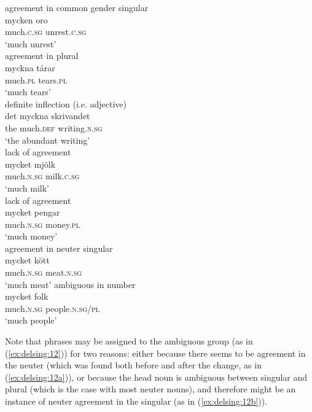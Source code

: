 \documentclass[output=paper]{langscibook}
\begin{document}
\ea\label{ex:delsing:10}
\ea\label{ex:delsing:10a}agreement in common gender singular\\
\gll mycken        oro\\
    much.\textsc{c.sg}      unrest.\textsc{c.sg}                  \\
    \glt ‘much unrest’\\
\ex\label{ex:delsing:10b}agreement in plural\\
\gll myckna      tårar\\
    much.\textsc{pl}  tears.\textsc{pl}                                \\
    \glt ‘much tears’\\
\ex\label{ex:delsing:10c}definite inflection (i.e. adjective)\\
\gll det    myckna       skrivandet\\
    the    much.\textsc{def}   writing.\textsc{n.sg}\\
    \glt ‘the abundant writing’\\
\z
\ex\label{ex:delsing:11}
\ea lack of agreement\\\gll mycket      mjölk\\
    much.\textsc{n.sg}      milk.\textsc{c.sg}\\
    \glt ‘much milk’\\
\ex lack of agreement\\
    \gll mycket            pengar\\
    much.\textsc{n.sg}      money.\textsc{pl} \\
    \glt ‘much money’\\
\z
\ex\label{ex:delsing:12}
\ea\label{ex:delsing:12a}agreement in neuter singular\\
\gll mycket      kött\\
much.\textsc{n.sg}     meat.\textsc{n.sg} \\
    \glt ‘much meat’
\ex \label{ex:delsing:12b}ambiguous in number\\
\gll mycket          folk \\                           
    much.\textsc{n.sg}    people.\textsc{n.sg/pl} \\
    \glt ‘much people’
\z
\z


Note that phrases may be assigned to the ambiguous group (as in (\ref{ex:delsing:12})) for two reasons: either because there seems to be agreement in the neuter (which was found both before and after the change, as in (\ref{ex:delsing:12a})), or because the head noun is ambiguous between singular and plural (which is the case with most neuter nouns), and therefore might be an instance of neuter agreement in the singular (as in (\ref{ex:delsing:12b})).
\end{document}

